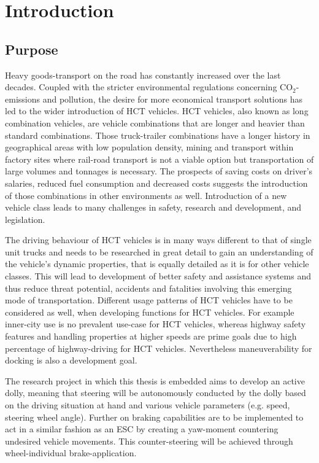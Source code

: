 \documentclass[ExampleMasters.tex]{subfiles}
\begin{document}
\clearpage
{\pagestyle{empty}\cleardoublepage}%
\chapter{Introduction}
\label{chap:introduction}

\section{Purpose}
\label{sec:purpose}
Heavy goods-transport on the road has constantly increased over the last decades. Coupled with the stricter environmental regulations concerning CO$_{2}$-emissions and pollution, the desire for more economical transport solutions has led to the wider introduction of \gls{HCT} vehicles. \gls{HCT} vehicles, also known as long combination vehicles, are vehicle combinations that are longer and heavier than standard combinations. Those truck-trailer combinations have a longer history in geographical areas with low population density, mining and transport within factory sites where rail-road transport is not a viable option but transportation of large volumes and tonnages is necessary. The prospects of saving costs on driver's salaries, reduced fuel consumption and decreased costs suggests the introduction of those combinations in other environments as well. Introduction of a new vehicle class leads to many challenges in safety, research and development, and legislation. 

The driving behaviour of \gls{HCT} vehicles is in many ways different to that of single unit trucks and needs to be researched in great detail to gain an understanding of the vehicle's dynamic properties, that is equally detailed as it is for other vehicle classes. This will lead to development of better safety and assistance systems and thus reduce threat potential, accidents and fatalities involving this emerging mode of transportation. Different usage patterns of \gls{HCT} vehicles have to be considered as well, when developing functions for \gls{HCT} vehicles. For example inner-city use is no prevalent use-case for \gls{HCT} vehicles, whereas highway safety features and handling properties at higher speeds are prime goals due to high percentage of highway-driving for \gls{HCT} vehicles. Nevertheless maneuverability for docking is also a development goal.

The research project in which this thesis is embedded aims to develop an active dolly, meaning that steering will be autonomously conducted by the dolly based on the driving situation at hand and various vehicle parameters (e.g. speed, steering wheel angle). Further on braking capabilities are to be implemented to act in a similar fashion as an \gls{ESC} by creating a yaw-moment countering undesired vehicle movements. This counter-steering will be achieved through wheel-individual brake-application. 
\end{document}
